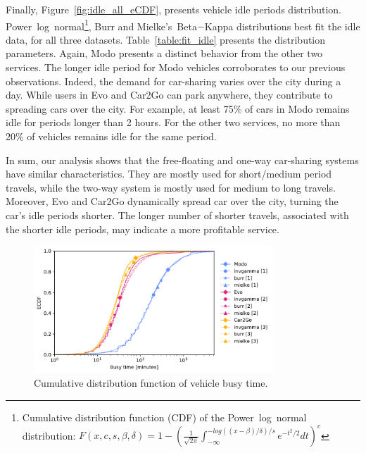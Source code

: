 Finally, Figure~\ref{fig:idle_all_eCDF}, presents vehicle idle periods distribution.  Power~log~normal\footnote{Cumulative distribution function (CDF) of the Power~log~normal distribution: $F(x,c,s,\beta,\delta)=1-\left(\frac{1}{\sqrt{2\pi}}\int_{-\infty}^{-log((x-\beta)/\delta)/s}e^{-t^{2}/2}dt\right)^{c}$}, Burr and Mielke's~Beta$-$Kappa distributions best fit the idle data, for all three datasets. Table~\ref{table:fit_idle} presents the distribution parameters. 
Again, Modo presents a distinct behavior from the other two services. The longer idle period for Modo vehicles corroborates to our previous observations. Indeed, the demand for car-sharing varies over the city during a day. While users in Evo and Car2Go can park anywhere, they contribute to spreading cars over the city. For example, at least 75\% of cars in Modo remains idle for periods longer than 2 hours. For the other two services, no more than 20\% of vehicles remains idle for the same period.

In sum, our analysis shows that the free-floating and one-way car-sharing systems have similar characteristics. They are mostly used for short/medium period travels, while the two-way system is mostly used for medium to long travels. 
Moreover, Evo and Car2Go dynamically spread car over the city, turning the car's idle periods shorter. The longer number of shorter travels, associated with the shorter idle periods, may indicate a more profitable service.

\begin{figure}[tbh]
   \centering
   \includegraphics[width=9cm]{images_test/CDF_Fit_final.pdf}
   \caption{Cumulative distribution function of vehicle busy time.}
   \label{fig:busy_all_eCDF}
\end{figure}


